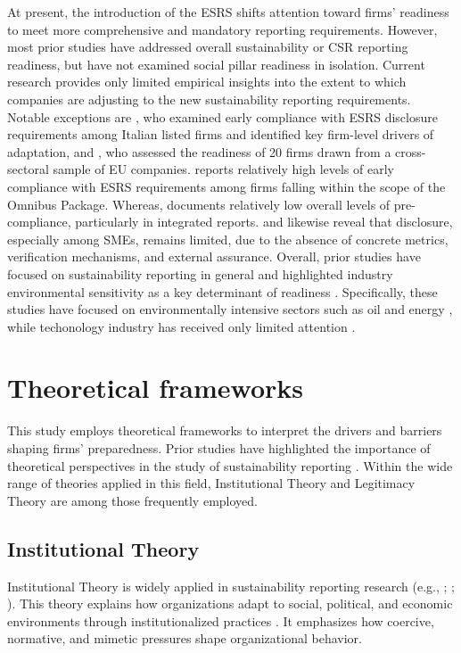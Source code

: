 At present, the introduction of the ESRS shifts attention toward firms' readiness to 
meet more comprehensive and mandatory reporting requirements. However, most prior studies 
have addressed overall sustainability or CSR reporting readiness,
but have not examined social pillar readiness in isolation. Current research provides only 
limited empirical insights into the extent to which companies are adjusting to the new 
sustainability reporting requirements. Notable exceptions are \textcite{Nicolo2025}, who examined early compliance with 
ESRS disclosure requirements among Italian listed firms and identified key firm-level drivers of 
adaptation, and \textcite{Filho2025}, who assessed the readiness of 20 firms drawn from a cross-sectoral 
sample of EU companies. \textcite{Nicolo2025} reports relatively high levels of early compliance 
with ESRS requirements among firms falling within the scope of the Omnibus Package. Whereas, 
\textcite{Raimo2025} documents relatively low overall levels of pre-compliance, 
particularly in integrated reports. \textcite{Filho2025} and \textcite{Montero2025} likewise reveal 
that disclosure, especially among SMEs, remains limited, due to the absence of concrete metrics, 
verification mechanisms, and external assurance. Overall, prior studies have focused on 
sustainability reporting in general and highlighted industry environmental sensitivity 
as a key determinant of readiness \parencite{Filho2025, Raimo2025, Nicolo2025, Montero2025}.
Specifically, these studies have focused on environmentally intensive sectors such as oil and 
energy \parencite{Filho2025, Raimo2025, Nicolo2025}, while techonology industry has received 
only limited attention \parencite{Montero2025}.

\section{Theoretical frameworks}

This study employs theoretical frameworks to interpret the drivers and barriers shaping firms' preparedness.
Prior studies have highlighted the importance of theoretical perspectives 
in the study of sustainability reporting \parencite{Gesso2023, Rezaee2016, Lozano2015}.
Within the wide range of theories applied in this field, Institutional Theory
and Legitimacy Theory are among those frequently employed.

\subsection{Institutional Theory}
Institutional Theory is widely applied in sustainability 
reporting research (e.g., \citeauthor{Campbell2007} \citeyear{Campbell2007}; \citeauthor{Nikolaeva2010} \citeyear{Nikolaeva2010};
\citeauthor{Shabana2017} \citeyear{Shabana2017}). This theory explains 
how organizations adapt to social, political, and economic environments 
through institutionalized practices 
\parencite{Meyer1977, DiMaggio1983}.
It emphasizes how coercive, normative, and mimetic pressures shape organizational behavior.

